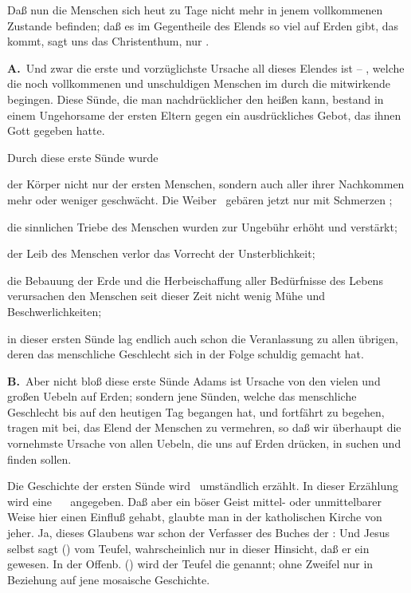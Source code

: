 Daß nun die Menschen sich heut zu Tage nicht mehr in jenem vollkommenen Zustande befinden; daß es im Gegentheile des Elends so viel auf Erden gibt, das kommt, sagt uns das Christenthum, nur .\par
\textbf{A.}~Und zwar die erste und vorzüglichste Ursache all dieses Elendes ist -- , welche die noch vollkommenen und unschuldigen Menschen im  durch die mitwirkende  begingen. Diese Sünde, die man nachdrücklicher den  heißen kann, bestand in einem Ungehorsame der ersten Eltern gegen ein ausdrückliches Gebot, das ihnen Gott gegeben hatte.\par
Durch diese erste Sünde wurde
\begin{aufza}
\item der Körper nicht nur der ersten Menschen, sondern auch aller ihrer Nachkommen mehr oder weniger geschwächt. Die Weiber \zB\ gebären jetzt nur mit Schmerzen \usw ;
\item die sinnlichen Triebe des Menschen wurden zur Ungebühr erhöht und verstärkt;
\item der Leib des Menschen verlor das Vorrecht der Unsterblichkeit;
\item die Bebauung der Erde und die Herbeischaffung aller Bedürfnisse des Lebens verursachen den Menschen seit dieser Zeit nicht wenig Mühe und Beschwerlichkeiten;
\item in dieser ersten Sünde lag endlich auch schon die Veranlassung zu allen übrigen, deren das menschliche Geschlecht sich in der Folge schuldig gemacht hat.
\end{aufza}\par

\vabst \textbf{B.}~Aber nicht bloß diese erste Sünde Adams ist Ursache von den vielen und großen Uebeln auf Erden; sondern jene Sünden, welche das menschliche Geschlecht bis auf den heutigen Tag begangen hat, und fortfährt zu begehen, tragen mit bei, das Elend der Menschen zu vermehren, so daß wir überhaupt die vornehmste Ursache von allen Uebeln, die uns auf Erden drücken, in  suchen und finden sollen.

Die Geschichte der ersten Sünde wird \ umständlich erzählt. In dieser Erzählung wird eine ~\  angegeben. Daß aber ein böser Geist mittel- oder unmittelbarer Weise hier einen Einfluß gehabt, glaubte man in der katholischen Kirche von jeher. Ja, dieses Glaubens war schon der Verfasser des Buches der :  Und Jesus selbst sagt () vom Teufel, wahrscheinlich nur in dieser Hinsicht, daß er ein  gewesen. In der Offenb. () wird der Teufel die  genannt; ohne Zweifel nur in Beziehung auf jene mosaische Geschichte.\par

